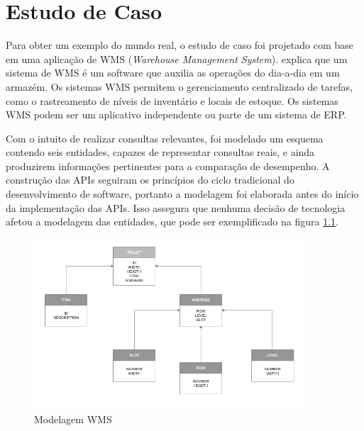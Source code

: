 \chapter[Estudo de Caso]{Estudo de Caso}

Para obter um exemplo do mundo real, o estudo de caso foi projetado com base em uma aplicação de WMS (\textit{Warehouse Management System}).  explica que um sistema de WMS é um software que auxilia as operações do dia-a-dia em um armazém. Os sistemas WMS permitem o gerenciamento centralizado de tarefas, como o rastreamento de níveis de inventário e locais de estoque. Os sistemas WMS podem ser  um aplicativo independente ou parte de um sistema de ERP.

Com o intuito de realizar consultas relevantes, foi modelado um esquema contendo seis entidades, capazes de representar consultas reais, e ainda produzirem informações pertinentes para a comparação de desempenho. A construção das APIs seguiram os princípios do ciclo tradicional do desenvolvimento de software, portanto a modelagem foi elaborada antes do início da implementação das APIs. Isso assegura que nenhuma decisão de tecnologia afetou a modelagem das entidades, que pode ser exemplificado na figura \ref{fig:marlon}.

\begin{figure}[htbp]
\centering
\includegraphics[width=0.9\textwidth]{figuras/model.png}
\caption{Modelagem WMS}
\label{fig:marlon}
\author{fonte: Autor}
\end{figure}

